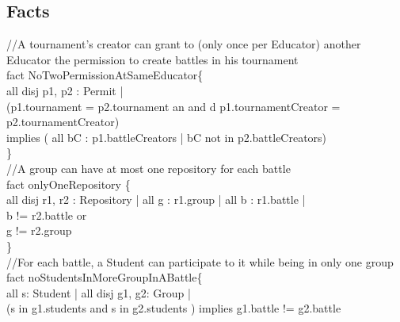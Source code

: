 \documentclass{article}
\begin{document}
{\subsection{Facts}
\color{gray}
//A tournament's creator can grant to (only once per Educator) another Educator the permission to create battles in his tournament\\
\color{black}
\color{blue} fact \color{black} NoTwoPermissionAtSameEducator\{\\
\-\hspace{1cm} \color{blue} all disj \color{black} p1, p2 : Permit | \\
\-\hspace{1cm} (p1.tournament \color{blue} = \color{black} p2.tournament an\color{blue} and \color{black}d p1.tournamentCreator \color{blue} = \color{black} p2.tournamentCreator) \\
\-\hspace{1cm} implies (\color{blue} all \color{black} bC : p1.battleCreators | bC \color{blue} not in \color{black} p2.battleCreators)\\
\}
\\
\color{gray}
//A group can have at most one repository for each battle\\
\color{blue} fact \color{black} onlyOneRepository \{\\
\-\hspace{1cm} \color{blue} all disj \color{black} r1, r2 : Repository | \color{blue} all \color{black} g : r1.group | \color{blue} all \color{black} b : r1.battle | \\
\-\hspace{1cm}b \color{blue} != \color{black} r2.battle or \\
\-\hspace{1cm}g \color{blue} != \color{black} r2.group \\
\}
\\
\color{gray}
//For each battle, a Student can participate to it while being in only one group\\
\color{black}
\color{blue} fact \color{black} noStudentsInMoreGroupInABattle\{\\
\-\hspace{1cm} \color{blue} all \color{black} s: Student | \color{blue} all disj \color{black} g1, g2: Group | \\
\-\hspace{1cm}(s \color{blue} in \color{black} g1.students \color{blue} and \color{black} s \color{blue} in \color{black} g2.students ) \color{blue} implies \color{black} g1.battle != g2.battle \\
}
\end{document}
